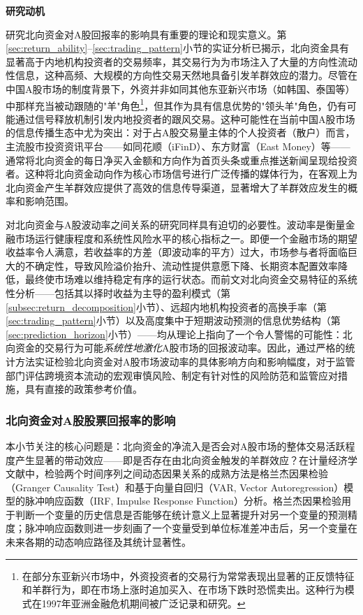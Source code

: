 \documentclass{article}
\begin{document}
\vspace{0.5em}
\noindent\textbf{研究动机}

研究北向资金对A股回报率的影响具有重要的理论和现实意义。第\ref{sec:return_ability}--\ref{sec:trading_pattern}小节的实证分析已揭示，北向资金具有显著高于内地机构投资者的交易频率，其交易行为为市场注入了大量的方向性流动性信息，这种高频、大规模的方向性交易天然地具备引发羊群效应的潜力。尽管在中国A股市场的制度背景下，外资并非如同其他东亚新兴市场（如韩国、泰国等）中那样充当被动跟随的"羊"角色\footnote{在部分东亚新兴市场中，外资投资者的交易行为常常表现出显著的正反馈特征和羊群行为，即在市场上涨时追加买入、在市场下跌时恐慌卖出。这种行为模式在1997年亚洲金融危机期间被广泛记录和研究。}，但其作为具有信息优势的"领头羊"角色，仍有可能通过信号释放机制引发内地投资者的跟风交易。这种可能性在当前中国A股市场的信息传播生态中尤为突出：对于占A股交易量主体的个人投资者（散户）而言，主流股市投资资讯平台——如同花顺（iFinD）、东方财富（East Money）等——通常将北向资金的每日净买入金额和方向作为首页头条或重点推送新闻呈现给投资者。这种将北向资金动向作为核心市场信号进行广泛传播的媒体行为，在客观上为北向资金产生羊群效应提供了高效的信息传导渠道，显著增大了羊群效应发生的概率和影响范围。

对北向资金与A股波动率之间关系的研究同样具有迫切的必要性。波动率是衡量金融市场运行健康程度和系统性风险水平的核心指标之一。即便一个金融市场的期望收益率令人满意，若收益率的方差（即波动率的平方）过大，市场参与者将面临巨大的不确定性，导致风险溢价抬升、流动性提供意愿下降、长期资本配置效率降低，最终使市场难以维持稳定有序的运行状态。而前文对北向资金交易特征的系统性分析——包括其以择时收益为主导的盈利模式（第\ref{subsec:return_decomposition}小节）、远超内地机构投资者的高换手率（第\ref{sec:trading_pattern}小节）以及高度集中于短期波动预测的信息优势结构（第\ref{sec:prediction_horizon}小节）——均从理论上指向了一个令人警惕的可能性：北向资金的交易行为可能\textit{系统性地激化}A股市场的回报波动率。因此，通过严格的统计方法实证检验北向资金对A股市场波动率的具体影响方向和影响幅度，对于监管部门评估跨境资本流动的宏观审慎风险、制定有针对性的风险防范和监管应对措施，具有直接的政策参考价值。

\subsubsection{北向资金对A股股票回报率的影响}
\label{sec:return_impact}

本小节关注的核心问题是：北向资金的净流入是否会对A股市场的整体交易活跃程度产生显著的带动效应——即是否存在由北向资金触发的羊群效应？在计量经济学文献中，检验两个时间序列之间动态因果关系的成熟方法是格兰杰因果检验（Granger Causality Test）和基于向量自回归（VAR, Vector Autoregression）模型的脉冲响应函数（IRF, Impulse Response Function）分析。格兰杰因果检验用于判断一个变量的历史信息是否能够在统计意义上显著提升对另一个变量的预测精度；脉冲响应函数则进一步刻画了一个变量受到单位标准差冲击后，另一个变量在未来各期的动态响应路径及其统计显著性。
\end{document}
